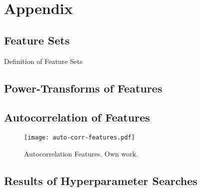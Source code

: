 \section{Appendix}


\subsection{Feature Sets}
\label{app:feature-sets}

\begin{table}[H]
    \centering
    
    \caption[Overview of Feature Sets]{Definition of Feature Sets}
    \label{tab:feature-set-definition}
\end{table}

\newpage

\newpage
\subsection{Power-Transforms of Features}
\label{app:power-transforms-of-features}

\newpage
\subsection{Autocorrelation of Features}
\label{app:autocorrelation-of-features}

\begin{figure}[ht]
    \centering
    \texttt{[image: auto-corr-features.pdf]}
    \caption[Autocorrelation of Features]{Autocorrelation Features. Own work.}
    \label{fig:auto-correlation-features}
\end{figure}

\subsection{Results of Hyperparameter Searches}

